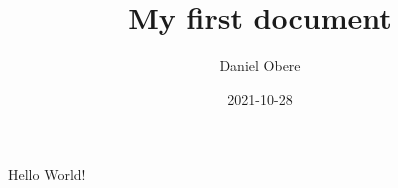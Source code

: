 \documentclass{article}
\title{My first document}
\date{2021-10-28}
\author{Daniel Obere}
\begin{document}
	\maketitle
	\newpage
	Hello World!
\end{document}
